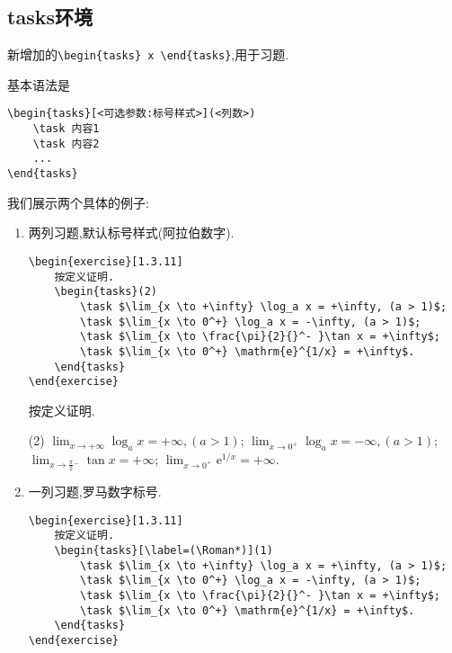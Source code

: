 \documentclass[lang=cn,12pt,scheme=chinese,mode=simple,black]{elegantbook}
\begin{document}
\subsection{tasks环境}
新增加的\verb|\begin{tasks} x \end{tasks}|,用于习题.

基本语法是
\begin{lstlisting}
\begin{tasks}[<可选参数:标号样式>](<列数>)
    \task 内容1
    \task 内容2
    ...
\end{tasks}
\end{lstlisting}

我们展示两个具体的例子:

\begin{enumerate}
    \item 两列习题,默认标号样式(阿拉伯数字).
          \begin{lstlisting}
\begin{exercise}[1.3.11]
    按定义证明.
    \begin{tasks}(2)
        \task $\lim_{x \to +\infty} \log_a x = +\infty, (a > 1)$;
        \task $\lim_{x \to 0^+} \log_a x = -\infty, (a > 1)$;
        \task $\lim_{x \to \frac{\pi}{2}{}^- }\tan x = +\infty$;
        \task $\lim_{x \to 0^+} \mathrm{e}^{1/x} = +\infty$.
    \end{tasks}
\end{exercise}
\end{lstlisting}

          \begin{resultbox}
              \begin{exercise}[1.3.11]
                  按定义证明.
                  \begin{tasks}(2)
                      \task $\lim_{x \to +\infty} \log_a x = +\infty, (a > 1)$;
                      \task $\lim_{x \to 0^+} \log_a x = -\infty, (a > 1)$;
                      \task $\lim_{x \to \frac{\pi}{2}{}^- }\tan x = +\infty$;
                      \task $\lim_{x \to 0^+} \mathrm{e}^{1/x} = +\infty$.
                  \end{tasks}
              \end{exercise}
          \end{resultbox}

    \item 一列习题,罗马数字标号.
          \begin{lstlisting}
\begin{exercise}[1.3.11]
    按定义证明.
    \begin{tasks}[\label=(\Roman*)](1)
        \task $\lim_{x \to +\infty} \log_a x = +\infty, (a > 1)$;
        \task $\lim_{x \to 0^+} \log_a x = -\infty, (a > 1)$;
        \task $\lim_{x \to \frac{\pi}{2}{}^- }\tan x = +\infty$;
        \task $\lim_{x \to 0^+} \mathrm{e}^{1/x} = +\infty$.
    \end{tasks}
\end{exercise}
\end{lstlisting}


\end{enumerate}
\end{document}
